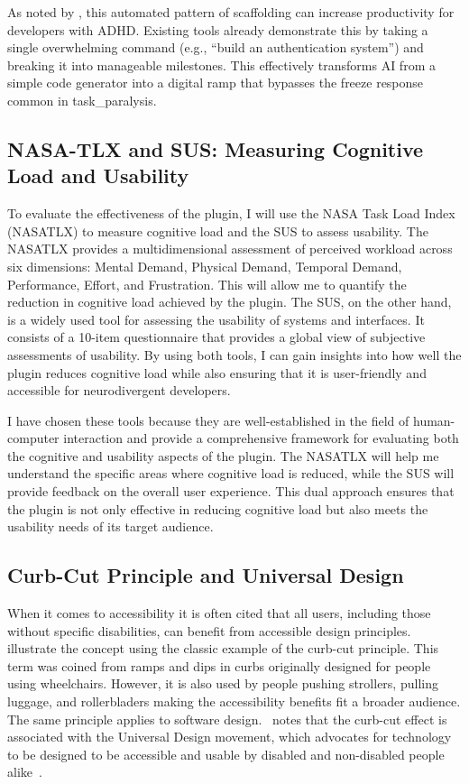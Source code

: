 As noted by \textcite{Navigati93:online}, this automated pattern of \gls{scaffolding} can increase productivity for developers with \gls{ADHD}. Existing tools already demonstrate this by taking a single
 overwhelming command (e.g., ``build an authentication system'') and breaking it into manageable milestones. This effectively transforms \gls{AI} from a simple code generator into a digital ramp that bypasses 
 the freeze response common in \gls{task_paralysis}.

 \subsection{NASA-TLX and SUS: Measuring Cognitive Load and Usability}
To evaluate the effectiveness of the plugin, I will use the NASA Task Load Index (\gls{NASATLX}) to measure cognitive load and the \gls{SUS} to assess usability.
The \gls{NASATLX} provides a multidimensional assessment of perceived workload across six dimensions: Mental Demand, Physical Demand, Temporal Demand, Performance, Effort, and Frustration.
This will allow me to quantify the reduction in cognitive load achieved by the plugin. The \gls{SUS}, on the other hand, is a widely used tool for assessing the usability of systems and interfaces.
It consists of a 10-item questionnaire that provides a global view of subjective assessments of usability. By using both tools, I can gain insights into how well the plugin reduces cognitive
 load while also ensuring that it is user-friendly and accessible for \gls{neurodivergent} developers.

 I have chosen these tools because they are well-established in the field of human-computer interaction and provide a comprehensive framework for evaluating both the cognitive and usability
  aspects of the plugin. The \gls{NASATLX} will help me understand the specific areas where cognitive load is reduced, while the \gls{SUS} will provide feedback on the overall user experience. 
  This dual approach ensures that the plugin is not only effective in reducing cognitive load but also meets the usability needs of its target audience.

\subsection{Curb-Cut Principle and Universal Design}
When it comes to accessibility it is often cited that all users, including those without specific disabilities, can benefit from accessible design principles.
\textcite{johnson2003creating} illustrate the concept using the classic example of the curb-cut principle. This term was coined from ramps and dips in curbs originally 
designed for people using wheelchairs. However, it is also used by people pushing strollers, pulling luggage, and rollerbladers making the accessibility benefits fit a broader audience.
The same principle applies to software design.~\textcite{reid2024curb} notes that the curb-cut effect is associated with the Universal Design movement, which advocates for technology to be 
designed to be accessible and usable by disabled and non-disabled people alike~\cite{null2013universal}.

